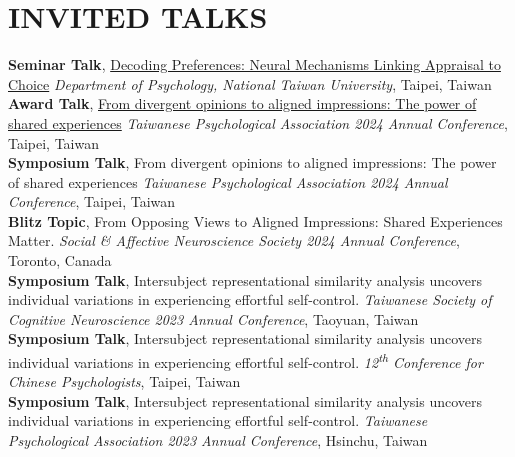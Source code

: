 \documentclass[a4paper,12pt]{article}
\newcommand{\sectionspace}{0pt} %
\newcommand{\itemspace}{7pt} %
\begin{document}
\section*{INVITED TALKS}
\textbf{Seminar Talk}, \href{http://www.psy.ntu.edu.tw/index.php/homepage/speech/2903-1131127}{Decoding Preferences: Neural Mechanisms Linking Appraisal to Choice} \textit{Department of Psychology, National Taiwan University}, Taipei, Taiwan \\[\itemspace]
\textbf{Award Talk}, \href{https://github.com/Ben-FCC/Ben-FCC_CV/blob/main/assets/2024_TPA_Oral.pdf}{From divergent opinions to aligned impressions: The power of shared experiences}  \textit{Taiwanese Psychological Association 2024 Annual Conference}, Taipei, Taiwan \\[\itemspace]
\textbf{Symposium Talk}, From divergent opinions to aligned impressions: The power of shared experiences  \textit{Taiwanese Psychological Association 2024 Annual Conference}, Taipei, Taiwan \\[\itemspace]
\textbf{Blitz Topic},  From Opposing Views to Aligned Impressions: Shared Experiences Matter.  \textit{Social \& Affective Neuroscience Society 2024 Annual Conference}, Toronto, Canada \\[\itemspace]
\textbf{Symposium Talk}, Intersubject representational similarity analysis uncovers individual variations in experiencing effortful self-control. \textit{Taiwanese Society of Cognitive Neuroscience 2023 Annual Conference}, Taoyuan, Taiwan \\[\itemspace]
\textbf{Symposium Talk}, Intersubject representational similarity analysis uncovers individual variations in experiencing effortful self-control.  \textit{12\textsuperscript{th} Conference for Chinese Psychologists}, Taipei, Taiwan \\[\itemspace]
\textbf{Symposium Talk}, Intersubject representational similarity analysis uncovers individual variations in experiencing effortful self-control.  \textit{Taiwanese Psychological Association 2023 Annual Conference}, Hsinchu, Taiwan 

\vspace{\sectionspace}
\end{document}
